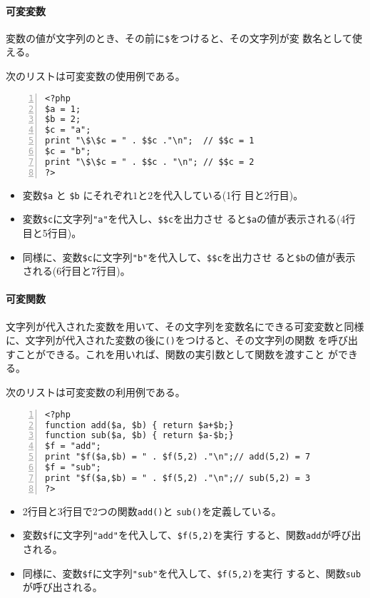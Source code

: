 \paragraph{可変変数}
 変数の値が文字列のとき、その前に\Verb+$+をつけると、その文字列が変
 数名として使える。
 \begin{Exec}\upshape
  次のリストは可変変数の使用例である。
\begin{Verbatim}[numbers=left]
<?php
$a = 1;
$b = 2;
$c = "a";
print "\$\$c = " . $$c ."\n";  // $$c = 1
$c = "b";
print "\$\$c = " . $$c . "\n"; // $$c = 2
?>
\end{Verbatim}
  \begin{itemize}\upshape
   \item 変数\Verb+$a+ と \Verb+$b+ にそれぞれ$1$と$2$を代入している(1行
         目と2行目)。
   \item 変数\Verb+$c+に文字列\Verb+"a"+を代入し、\Verb+$$c+を出力させ
         ると\Verb+$a+の値が表示される(4行目と5行目)。
   \item 同様に、変数\Verb+$c+に文字列\Verb+"b"+を代入して、\Verb+$$c+を出力させ
         ると\Verb+$b+の値が表示される(6行目と7行目)。
  \end{itemize}
 \end{Exec}
 \fi
\paragraph{可変関数}
文字列が代入された変数を用いて、その文字列を変数名にできる可変変数と同様
に、文字列が代入された変数の後に\texttt{()}をつけると、その文字列の関数
を呼び出すことができる。これを用いれば、関数の実引数として関数を渡すこと
ができる。
\begin{Exec}\upshape
次のリストは可変変数の利用例である。
\begin{Verbatim}[numbers=left]
<?php
function add($a, $b) { return $a+$b;}
function sub($a, $b) { return $a-$b;}
$f = "add";
print "$f($a,$b) = " . $f(5,2) ."\n";// add(5,2) = 7
$f = "sub";
print "$f($a,$b) = " . $f(5,2) ."\n";// sub(5,2) = 3
?>
\end{Verbatim}
\begin{itemize}\upshape
 \item 2行目と3行目で2つの関数\texttt{add()}と
       \texttt{sub()}を定義している。
 \item 変数\Verb+$f+に文字列\Verb+"add"+を代入して、\Verb+$f(5,2)+を実行
       すると、関数\texttt{add}が呼び出される。
 \item 同様に、変数\Verb+$f+に文字列\Verb+"sub"+を代入して、\Verb+$f(5,2)+を実行
       すると、関数\texttt{sub}が呼び出される。
\end{itemize}
\end{Exec}
\fi
